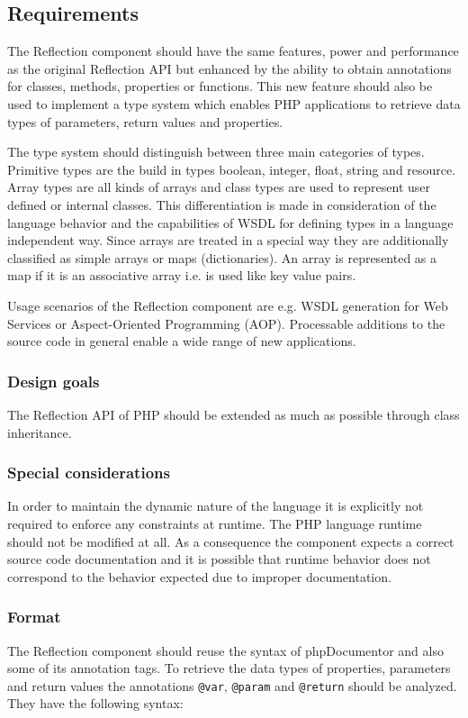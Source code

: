 \documentclass[10pt,final,a4paper,oneside]{article}
\begin{document}
\subsection{Requirements}\label{subsec:ReflectionRequirements}
The Reflection component should have
the same features, power and performance
as the original Reflection API
but enhanced by the ability to obtain annotations
for classes, methods, properties or functions.
This new feature should also be used
to implement a type system
which enables PHP applications to retrieve
data types of parameters, return values and properties.

The type system should distinguish between three main categories of types.
Primitive types are the build in types boolean, integer, float, string and resource.
Array types are all kinds of arrays and
class types are used to represent user defined or internal classes.
This differentiation is made
in consideration of the language behavior
and the capabilities of WSDL for defining types
in a language independent way.
Since arrays are treated in a special way
they are additionally classified as simple arrays or maps (dictionaries).
An array is represented as a map if it is an associative array
i.e. is used like key value pairs.

Usage scenarios of the Reflection component are
e.g. WSDL generation for Web Services
or Aspect-Oriented Programming (AOP).
Processable additions to the source code in general
enable a wide range of new applications.

\subsubsection{Design goals}
The Reflection API of PHP should be extended
as much as possible through class inheritance.

\subsubsection{Special considerations}
In order to maintain the dynamic nature of the language
it is explicitly not required
to enforce any constraints at runtime.
The PHP language runtime should not be modified at all.
As a consequence the component expects a correct source code documentation
and it is possible that runtime behavior does not correspond
to the behavior expected due to improper documentation.

\subsubsection{Format}\label{subsubsec:ReflectionFormat}
The Reflection component should reuse the syntax
of phpDocumentor \cite{phpDocumentor}
and also some of its annotation tags.
To retrieve the data types of properties,
parameters and return values the annotations
\verb|@var|,
\verb|@param| and
\verb|@return| should be analyzed.
They have the following syntax:
\end{document}
